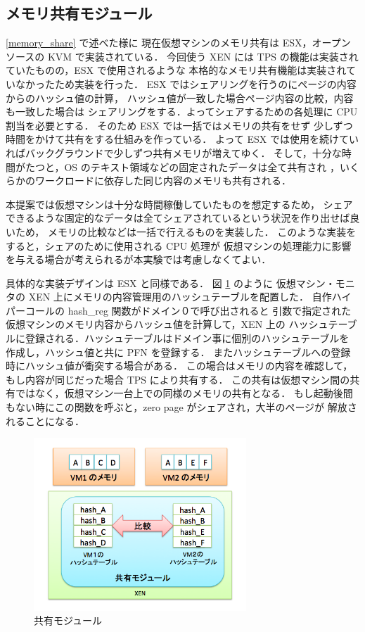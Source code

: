\documentclass[graduation-thesis]{mlarticle}
\begin{document}
\subsection{メモリ共有モジュール}
\label{sec-5-2}
\ref{memory_share} で述べた様に
 現在仮想マシンのメモリ共有は ESX，オープンソースの KVM で実装されている．
 今回使う XEN には TPS の機能は実装されていたものの，ESX で使用されるような
 本格的なメモリ共有機能は実装されていなかったため実装を行った．
 ESX ではシェアリングを行うのにページの内容からのハッシュ値の計算，
 ハッシュ値が一致した場合ページ内容の比較，内容も一致した場合は
 シェアリングをする．よってシェアするための各処理に CPU 割当を必要とする．
 そのため ESX では一括ではメモリの共有をせず
 少しずつ時間をかけて共有をする仕組みを作っている．
 よって ESX では使用を続けていればバックグラウンドで少しずつ共有メモリが増えてゆく．
 そして，十分な時間がたつと，OS のテキスト領域などの固定されたデータは全て共有され
 ，いくらかのワークロードに依存した同じ内容のメモリも共有される．

本提案では仮想マシンは十分な時間稼働していたものを想定するため，
シェアできるような固定的なデータは全てシェアされているという状況を作り出せば良いため，
メモリの比較などは一括で行えるものを実装した．
このような実装をすると，シェアのために使用される CPU 処理が
仮想マシンの処理能力に影響を与える場合が考えられるが本実験では考慮しなくてよい．

具体的な実装デザインは ESX \cite{Waldspurger:2002:MRM}と同様である．
図 \ref{sharing_module} のように
仮想マシン・モニタの XEN 上にメモリの内容管理用のハッシュテーブルを配置した．
自作ハイパーコールの hash\_reg 関数がドメイン０で呼び出されると
引数で指定された仮想マシンのメモリ内容からハッシュ値を計算して，XEN 上の
ハッシュテーブルに登録される．ハッシュテーブルはドメイン事に個別のハッシュテーブルを
作成し，ハッシュ値と共に PFN を登録する．
またハッシュテーブルへの登録時にハッシュ値が衝突する場合がある．
この場合はメモリの内容を確認して，もし内容が同じだった場合 TPS により共有する．
この共有は仮想マシン間の共有ではなく，仮想マシン一台上での同様のメモリの共有となる．
もし起動後間もない時にこの関数を呼ぶと，zero page がシェアされ，大半のページが
解放されることになる．

\begin{figure}[H]\begin{center}\includegraphics[width=8.0cm]{./img/sharing_module.png}\caption{ 共有モジュール}\label{sharing_module}\end{center}\end{figure}
\end{document}
